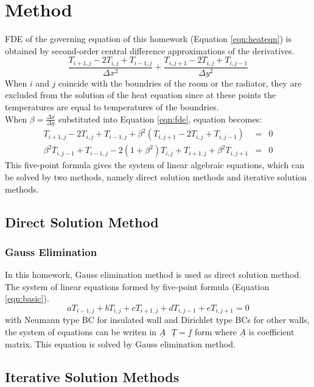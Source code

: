 \documentclass[letterpaper,12pt]{article}
\begin{document}
\section{Method}
FDE of the governing equation of this homework (Equation \ref{eqn:heateqn}) is obtained by second-order central difference approximations of the derivatives.
\begin{equation}
	\frac{T_{i+1,j}-2T_{i,j}+T_{i-1,j}}{\Delta x^2}+\frac{T_{i,j+1}-2T_{i,j}+T_{i,j-1}}{\Delta y^2}
	\label{eqn:fde}
\end{equation}
When $i$ and $j$ coincide with the boundries of the room or the radiator, they are excluded
from the solution of the heat equation since at these points the temperatures are equal to
temperatures of the boundries.\\
When $\beta = \frac{\Delta x}{\Delta y}$ substituted into Equation \ref{eqn:fde}, equation becomes:
\begin{eqnarray}
	T_{i+1,j}-2T_{i,j}+T_{i-1,j}+\beta ^2(T_{i,j+1}-2T_{i,j}+T_{i,j-1})&=&0 \nonumber \\
	\beta^2T_{i,j-1}+T_{i-1,j}-2(1+\beta^2)T_{i,j}+T_{i+1,j}+\beta ^2T_{i,j+1}&=&0 
	\label{eqn:basic}
\end{eqnarray}
This five-point formula gives the system of linear algebraic equations, which can be solved by two methods,
namely direct solution methods and iterative solution methods.
\subsection{Direct Solution Method}
\subsubsection{Gauss Elimination}
In this homework, Gauss elimination method is used as direct solution method. The system of linear
equations formed by five-point formula (Equation \ref{eqn:basic}).
\begin{equation}
	aT_{i-1,j}+bT_{i,j}+cT_{i+1,j}+dT_{i,j-1}+eT_{i,j+1}=0
\end{equation}
with Neumann type BC for insulated wall and Dirichlet type BCs for other walls,
the system of equations can be writen in $\underline{A}\mbox{ }\underline{T}=\underline{f}$ form
where $\underline{A}$ is coefficient matrix.
This equation is solved by Gauss elimination method.

\subsection{Iterative Solution Methods}
\label{subsec:iterative}
\end{document}
